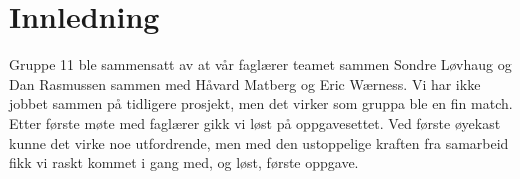 \section{Innledning}
Gruppe 11 ble sammensatt av at vår faglærer teamet sammen Sondre Løvhaug og Dan Rasmussen sammen med Håvard Matberg og Eric Wærness. Vi har ikke jobbet sammen på tidligere prosjekt, men det virker som gruppa ble en fin match. Etter første møte med faglærer gikk vi løst på oppgavesettet. Ved første øyekast kunne det virke noe utfordrende, men med den ustoppelige kraften fra samarbeid fikk vi raskt kommet i gang med, og løst, første oppgave.